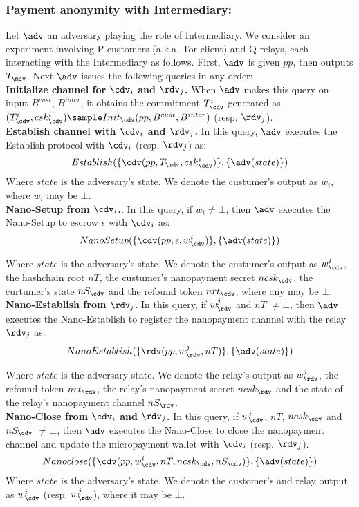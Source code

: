 \subsubsection{Payment anonymity with Intermediary:} 
Let $\adv$ an adversary playing the role of Intermediary. We consider an experiment involving P customers (a.k.a. Tor client) and Q relays, each interacting with the Intermediary as follows. First, $\adv$ is given $pp$, then outputs $T_\mdv$. Next $\adv$ issues the following queries in any order:\\

\textbf{Initialize channel for $\cdv_i$ and $\rdv_j$.} When $\adv$ makes this query on input $B^{cust}$, $B^{inter}$, it obtains the commitment $T^i_\cdv$ generated as $(T^i_\cdv, csk^i_\cdv) \sample Init_\cdv(pp, B^{cust}, B^{inter})$ (resp. $\rdv_j$).\\

\textbf{Establish channel with $\cdv_i$ and $\rdv_j$.} In this query, $\adv$ executes the Establish protocol with $\cdv_i$ (resp. $\rdv_j$) as:
$$Establish(\{\cdv(pp, T_\mdv, csk^i_\cdv)\},\{\adv(state)\})$$
Where $state$ is the adversary's state. We denote the custumer's output as $w_i$, where $w_i$ may be $\bot$.\\

\textbf{Nano-Setup from $\cdv_i$.}. In this query, if $w_i \neq \bot$, then $\adv$ executes the Nano-Setup to escrow $\epsilon$ with $\cdv_i$ as:
$$Nano\-Setup(\{\cdv(pp, \epsilon, w^i_\cdv)\}, \{\adv(state)\})$$

Where $state$ is the adversary's state. We denote the custumer's output as $w^i_\cdv$, the hashchain root $nT$, the custumer's nanopayment secret $ncsk_\cdv$, the curtumer's state $nS_\cdv$ and the refound token $nrt_\cdv$, where any may be $\bot$.\\

\textbf{Nano-Establish from $\rdv_j$}. In this query, if $w^j_\rdv$ and $nT$ $\neq \bot$, then $\adv$ executes the Nano-Establish to register the nanopayment channel with the relay $\rdv_j$ as:
$$Nano\-Establish(\{\rdv(pp, w^j_\rdv, nT)\}, \{\adv(state)\})$$

Where $state$ is the adversary state. We denote the relay's output as $w^j_\rdv$, the refound token $nrt_\rdv$, the relay's nanopayment secret $ncsk_\rdv$ and the state of the relay's nanopayment channel $nS_\rdv$. \\

\textbf{Nano-Close from $\cdv_i$ and $\rdv_j$.} In this query, if $w^i_\cdv$, $nT$, $ncsk_\cdv$ and $nS_\cdv$ $\neq \bot$, then $\adv$ executes the Nano-Close to close the nanopayment channel and update the micropayment wallet with $\cdv_i$ (resp. $\rdv_j$).
$$Nano\-close(\{\cdv(pp, w^i_\cdv, nT, ncsk_\cdv, nS_\cdv)\}, \{\adv(state)\})$$
Where $state$ is the adversary's state. We denote the customer's and relay output as $w^i_\cdv$ (resp. $w^j_\rdv$), where it may be $\bot$.\\

